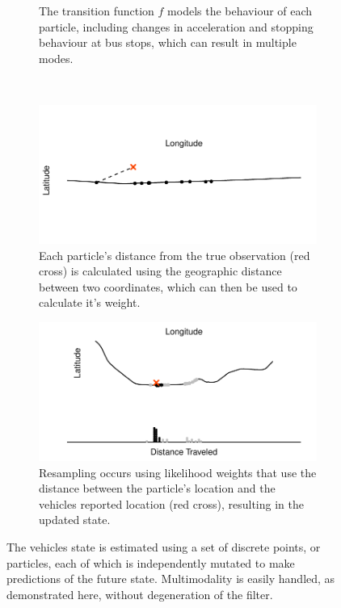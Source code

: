 \begin{figure}[tb]
\begin{subfigure}[t]{0.48\textwidth}
        \caption{The transition function $f$ models the behaviour of each particle,
            including changes in acceleration and stopping behaviour at bus stops,
            which can result in multiple modes.}
        \label{fig:pf_state_predict}
    \end{subfigure}\\
    \begin{subfigure}[t]{0.48\textwidth}
        \centering
        \includegraphics[width=\textwidth]{figures/03_particle_filter_6.pdf}
        \caption{Each particle's distance from the true observation (red cross) 
            is calculated using
            the geographic distance between two coordinates, which can then be used
            to calculate it's weight.}
        \label{fig:pf_state_update}
    \end{subfigure}\;\;
    \begin{subfigure}[t]{0.48\textwidth}
        \centering
        \includegraphics[width=\textwidth]{figures/03_particle_filter_4.pdf}
        \caption{Resampling occurs using likelihood weights that use the distance
            between the particle's location and the vehicles reported location (red cross),
            resulting in the updated state.}
        \label{fig:pf_state_predict2}
    \end{subfigure}
    \caption{The vehicles state is estimated using a set of discrete points, or particles,
        each of which is independently mutated to make predictions of the future state.
        Multimodality is easily handled, as demonstrated here,
        without degeneration of the filter.}
    \label{fig:pf_state}
\end{figure}




